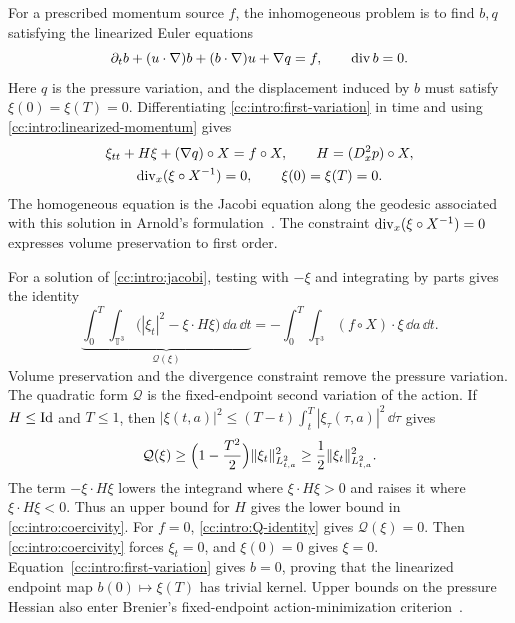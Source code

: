For a prescribed momentum source $f$, the inhomogeneous problem is to
find $b,q$ satisfying the linearized Euler equations
\begin{equation}\label{cc:intro:linearized-momentum}
 \partial_t b+(u\cdot\nabla)b+(b\cdot\nabla)u+\nabla q=f,
 \qquad \operatorname{div} b=0.
\end{equation}
Here $q$ is the pressure variation, and the displacement induced by $b$
must satisfy $\xi(0)=\xi(T)=0$. Differentiating
\eqref{cc:intro:first-variation} in time and using
\eqref{cc:intro:linearized-momentum} gives
\begin{equation}\label{cc:intro:jacobi}
 \begin{gathered}
 \xi_{tt}+H\xi+(\nabla q)\circ X=f\circ X,
 \qquad H=(D_x^2p)\circ X,\\
 \operatorname{div}_x(\xi\circ X^{-1})=0,\qquad \xi(0)=\xi(T)=0.
 \end{gathered}
\end{equation}
The homogeneous equation is the Jacobi equation along the geodesic
associated with this solution in Arnold's formulation~\cite{Arnold1966}.
The constraint $\operatorname{div}_x(\xi\circ X^{-1})=0$ expresses volume
preservation to first order.

For a solution of \eqref{cc:intro:jacobi}, testing with $-\xi$ and
integrating by parts gives the identity
\begin{equation}\label{cc:intro:Q-identity}
 \underbrace{\int_0^T\!\int_{\mathbb T^3}
   \bigl(|\xi_t|^2-\xi\cdot H\xi\bigr)\,\dd a\,\dd t}_{\mathcal Q(\xi)}
 =-\int_0^T\!\int_{\mathbb T^3}(f\circ X)\cdot\xi\,\dd a\,\dd t.
\end{equation}
Volume preservation and the divergence constraint remove the pressure
variation. The quadratic form $\mathcal Q$ is the fixed-endpoint second variation of the action.
If $H\le\operatorname{Id}$ and $T\le1$, then
${|\xi(t,a)|^2\le(T-t)\int_t^T|\xi_\tau(\tau,a)|^2\,\dd\tau}$ gives
\begin{equation}\label{cc:intro:coercivity}
 \mathcal Q(\xi)\ge\Bigl(1-\frac{T^2}{2}\Bigr)\|\xi_t\|_{L^2_{t,a}}^2
 \ge\frac12\|\xi_t\|_{L^2_{t,a}}^2 .
\end{equation}
The term $-\xi\cdot H\xi$ lowers the integrand where $\xi\cdot H\xi>0$
and raises it where $\xi\cdot H\xi<0$. Thus an upper bound for $H$ gives
the lower bound in \eqref{cc:intro:coercivity}.
For $f=0$, \eqref{cc:intro:Q-identity} gives $\mathcal Q(\xi)=0$. Then
\eqref{cc:intro:coercivity} forces $\xi_t=0$, and $\xi(0)=0$ gives $\xi=0$.
Equation~\eqref{cc:intro:first-variation} gives $b=0$, proving that the linearized
endpoint map $b(0)\mapsto\xi(T)$ has trivial kernel.
Upper bounds on the pressure Hessian also enter Brenier's fixed-endpoint
action-minimization criterion~\cite{Brenier1989,Brenier1999}.

